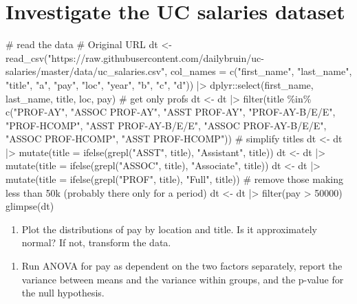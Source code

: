 \documentclass[
  letterpaper,
  DIV=11,
  numbers=noendperiod]{scrreprt}
\newenvironment{Shaded}{\begin{snugshade}}{\end{snugshade}}
\newcommand{\NormalTok}[1]{\textcolor[rgb]{0.00,0.23,0.31}{#1}}
\providecommand{\tightlist}{%
  \setlength{\itemsep}{0pt}\setlength{\parskip}{0pt}}\usepackage{longtable,booktabs,array}
\begin{document}
\section{Investigate the UC salaries
dataset}\label{investigate-the-uc-salaries-dataset}

\begin{Shaded}
\begin{Highlighting}[]
\NormalTok{\# read the data}
\NormalTok{\# Original URL}
\NormalTok{dt \textless{}{-} read\_csv("https://raw.githubusercontent.com/dailybruin/uc{-}salaries/master/data/uc\_salaries.csv", }
\NormalTok{col\_names = c("first\_name", "last\_name", "title", "a", "pay", "loc", "year", "b", "c", "d")) |\textgreater{}  dplyr::select(first\_name, last\_name, title, loc, pay)}
\NormalTok{\# get only profs}
\NormalTok{dt \textless{}{-} dt |\textgreater{} filter(title \%in\% c("PROF{-}AY", "ASSOC PROF{-}AY", "ASST PROF{-}AY", }
\NormalTok{                                 "PROF{-}AY{-}B/E/E", "PROF{-}HCOMP", "ASST PROF{-}AY{-}B/E/E", }
\NormalTok{                                 "ASSOC PROF{-}AY{-}B/E/E", "ASSOC PROF{-}HCOMP", "ASST PROF{-}HCOMP"))}
\NormalTok{\# simplify titles}
\NormalTok{dt \textless{}{-} dt |\textgreater{} mutate(title = ifelse(grepl("ASST", title), "Assistant", title))}
\NormalTok{dt \textless{}{-} dt |\textgreater{} mutate(title = ifelse(grepl("ASSOC", title), "Associate", title))}
\NormalTok{dt \textless{}{-} dt |\textgreater{} mutate(title = ifelse(grepl("PROF", title), "Full", title))}
\NormalTok{\# remove those making less than 50k (probably there only for a period)}
\NormalTok{dt \textless{}{-} dt |\textgreater{} filter(pay \textgreater{} 50000)}
\NormalTok{glimpse(dt)}
\end{Highlighting}
\end{Shaded}

\begin{enumerate}
\def\labelenumi{\arabic{enumi}.}
\tightlist
\item
  Plot the distributions of pay by location and title. Is it
  approximately normal? If not, transform the data.
\end{enumerate}

\begin{Shaded}
\begin{Highlighting}[]

\end{Highlighting}
\end{Shaded}

\begin{enumerate}
\def\labelenumi{\arabic{enumi}.}
\setcounter{enumi}{1}
\tightlist
\item
  Run ANOVA for pay as dependent on the two factors separately, report
  the variance between means and the variance within groups, and the
  p-value for the null hypothesis.
\end{enumerate}
\end{document}
